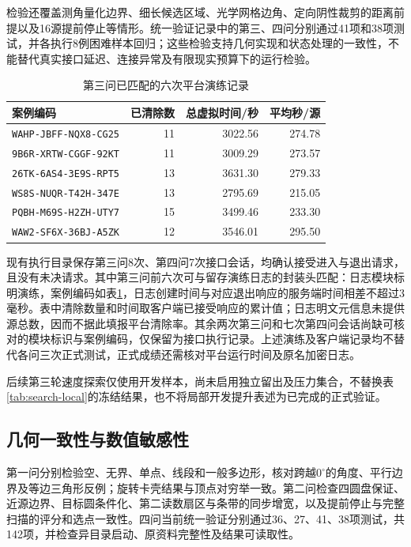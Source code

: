 \documentclass{JXUSTmodeling}
\begin{document}
检验还覆盖测角量化边界、细长候选区域、光学网格边角、定向阴性裁剪的距离前提以及16源提前停止等情形。统一验证记录中的第三、四问分别通过41项和38项测试，并各执行8例困难样本回归；这些检验支持几何实现和状态处理的一致性，不能替代真实接口延迟、连接异常及有限现实预算下的运行检验。

\begin{table}[htbp]
\centering\small
\caption{第三问已匹配的六次平台演练记录}
\label{tab:p3-practice}
\begin{tabular}{lrrr}
\toprule
案例编码 & 已清除数 & 总虚拟时间/秒 & 平均秒/源\\
\midrule
\texttt{WAHP-JBFF-NQX8-CG25}&11&3022.56&274.78\\
\texttt{9B6R-XRTW-CGGF-92KT}&11&3009.29&273.57\\
\texttt{26TK-6AS4-3E9S-RPT5}&13&3631.30&279.33\\
\texttt{WS8S-NUQR-T42H-347E}&13&2795.69&215.05\\
\texttt{PQBH-M69S-H2ZH-UTY7}&15&3499.46&233.30\\
\texttt{WAW2-SF6X-36BJ-A5ZK}&12&3546.01&295.50\\
\bottomrule
\end{tabular}
\end{table}

现有执行目录保存第三问8次、第四问7次接口会话，均确认接受进入与退出请求，且没有未决请求。其中第三问前六次可与留存演练日志的封装头匹配：日志模块标明演练，案例编码如表\ref{tab:p3-practice}，日志创建时间与对应退出响应的服务端时间相差不超过3毫秒。表中清除数量和时间取客户端已接受响应的累计值；日志明文元信息未提供源总数，因而不据此填报平台清除率。其余两次第三问和七次第四问会话尚缺可核对的模块标识与案例编码，仅保留为接口执行记录。上述演练及客户端记录均不替代各问三次正式测试，正式成绩还需核对平台运行时间及原名加密日志。

后续第三轮速度探索仅使用开发样本，尚未启用独立留出及压力集合，不替换表\ref{tab:search-local}的冻结结果，也不将局部开发提升表述为已完成的正式验证。

\subsection{几何一致性与数值敏感性}
第一问分别检验空、无界、单点、线段和一般多边形，核对跨越$0^\circ$的角度、平行边界及等边三角形反例；旋转卡壳结果与顶点对穷举一致。第二问检查四圆盘保证、近源边界、目标圆条件化、第二读数扇区与条带的同步增宽，以及提前停止与完整扫描的评分和选点一致性。四问当前统一验证分别通过36、27、41、38项测试，共142项，并检查异目录启动、原资料完整性及结果可读取性。
\end{document}
